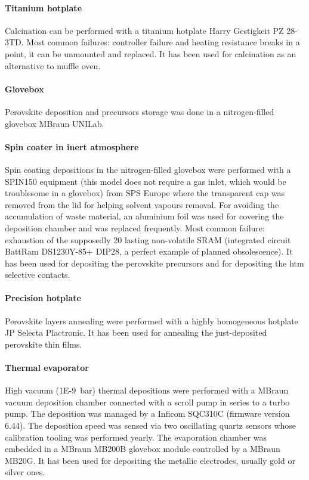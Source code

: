 	\paragraph{Titanium hotplate} Calcination can be performed with a titanium hotplate Harry Gestigkeit PZ 28-3TD.
	Most common failures: controller failure and heating resistance breaks in a point, it can be unmounted and replaced.
	It has been used for calcination as an alternative to muffle oven.

	\paragraph{Glovebox} Perovskite deposition and precursors storage was done in a nitrogen-filled glovebox MBraun UNILab.

	\paragraph{Spin coater in inert atmosphere} Spin coating depositions in the nitrogen-filled glovebox were performed with a SPIN150 equipment (this model does not require a gas inlet, which would be troublesome in a glovebox) from SPS Europe where the transparent cap was removed from the lid for helping solvent vapours removal. For avoiding the accumulation of waste material, an aluminium foil was used for covering the deposition chamber and was replaced frequently.
	Most common failure: exhaustion of the supposedly \SI{20}{\year} lasting non-volatile SRAM (integrated circuit BattRam DS1230Y-85+ DIP28, a perfect example of planned obsolescence).
	It has been used for depositing the perovskite precursors and for depositing the \gls{htm} selective contacts.

	\paragraph{Precision hotplate} Perovskite layers annealing were performed with a highly homogeneous hotplate JP Selecta Plactronic.
	It has been used for annealing the just-deposited perovskite thin films.
	
	\paragraph{Thermal evaporator} High vacuum (\SI{1E-9}{\bar}) thermal depositions were performed with a MBraun vacuum deposition chamber connected with a scroll pump in series to a turbo pump. The deposition was managed by a Inficom SQC310C (firmware version 6.44). The deposition speed was sensed via two oscillating quartz sensors whose calibration tooling was performed yearly. The evaporation chamber was embedded in a MBraun MB200B glovebox module controlled by a MBraun MB20G. %
	It has been used for depositing the metallic electrodes, usually gold or silver ones.
	
